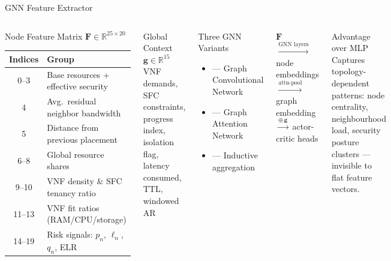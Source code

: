 \begin{frame}{GNN Feature Extractor}
  \begin{columns}[T]
      \begin{block}{Node Feature Matrix $\mathbf{F}\in\mathbb{R}^{25\times20}$}
        \footnotesize
        \begin{tabular}{cl}
          \toprule
          Indices & Group\\
          \midrule
          0--3  & Base resources + effective security\\
          4     & Avg.\ residual neighbor bandwidth\\
          5     & Distance from previous placement\\
          6--8  & Global resource shares\\
          9--10 & VNF density \& SFC tenancy ratio\\
          11--13& VNF fit ratios (RAM/CPU/storage)\\
          14--19& Risk signals: $p_n$, $\ell_n$, $q_n$, ELR\\
          \bottomrule
        \end{tabular}
      \end{block}
      \vspace{4pt}
      \begin{block}{Global Context $\mathbf{g}\in\mathbb{R}^{15}$}
        \footnotesize
        VNF demands, SFC constraints, progress index, isolation flag, latency consumed, TTL, windowed AR
      \end{block}
      \begin{block}{Three GNN Variants}
        \begin{itemize}
          \item {} --- Graph Convolutional Network
          \item {} --- Graph Attention Network
          \item {} --- Inductive aggregation
        \end{itemize}
      \end{block}
      \vspace{4pt}
      \begin{tcolorbox}[colback=lightgray, colframe=cuired, title=Architecture, fonttitle=\small\bfseries]
        \footnotesize
        $\mathbf{F}$ $\xrightarrow{\text{GNN layers}}$ node embeddings $\xrightarrow{\text{attn-pool}}$ graph embedding $\xrightarrow{\oplus\,\mathbf{g}}$ actor-critic heads
      \end{tcolorbox}
      \vspace{4pt}
      \begin{alertblock}{Advantage over MLP}
        Captures topology-dependent patterns: node centrality, neighbourhood load, security posture clusters --- invisible to flat feature vectors.
      \end{alertblock}
  \end{columns}
\end{frame}

